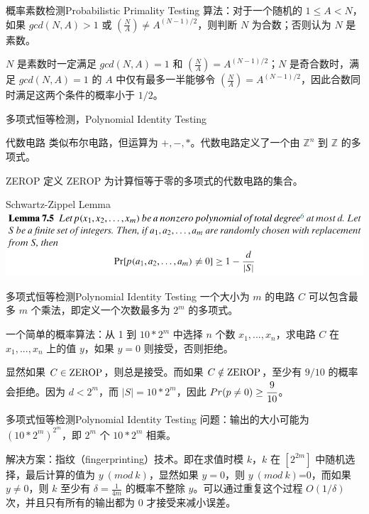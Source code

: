 \documentclass[UTF8,aspectratio=169,mathserif]{beamer}
\begin{document}
	\begin{frame}{概率素数检测}{Probabilistic Primality Testing}
		算法：对于一个随机的 $1\le A<N$，如果 $gcd(N,A)>1$ 或 $(\frac{N}{A})\neq A^{(N-1)/2}$，则判断 $N$ 为合数；否则认为 $N$ 是素数。\newline
		
		$N$ 是素数时一定满足 $gcd(N,A)=1$ 和 $(\frac{N}{A})=A^{(N-1)/2}$；$N$ 是奇合数时，满足 $gcd(N,A)=1$ 的 $A$ 中仅有最多一半能够令 $(\frac{N}{A})=A^{(N-1)/2}$，因此合数同时满足这两个条件的概率小于 $1/2$。
	\end{frame}
	
	\begin{frame}{多项式恒等检测，Polynomial Identity Testing}
		\begin{block}{代数电路}
			类似布尔电路，但运算为 $+,-,*$。代数电路定义了一个由 $\mathbb{Z}^n$ 到 $\mathbb{Z}$ 的多项式。
		\end{block}
		
		\begin{block}{ZEROP}
			定义 ZEROP 为计算恒等于零的多项式的代数电路的集合。
		\end{block}
	
		\begin{block}{Schwartz-Zippel Lemma}
			\includegraphics[width=\linewidth]{../../7/note.assets/image-20210509094630024.png}
		\end{block}
	\end{frame}

	\begin{frame}{多项式恒等检测}{Polynomial Identity Testing}
		一个大小为 $m$ 的电路 $C$ 可以包含最多 $m$ 个乘法，即定义一个次数最多为 $2^m$ 的多项式。\newline
		
		一个简单的概率算法：从 1 到 $10*2^m$ 中选择 $n$ 个数 $x_1,...,x_n$，求电路 $C$ 在 $x_1,...,x_n$ 上的值 $y$，如果 $y=0$ 则接受，否则拒绝。\newline
		
		显然如果 $C\in{\rm ZEROP}$，则总是接受。而如果 $C\notin{\rm ZEROP}$，至少有 $9/10$ 的概率会拒绝。因为 $d<2^m$，而 $|S|=10*2^m$，因此 $Pr(p\neq0)\ge\cfrac{9}{10}$。
	\end{frame}

	\begin{frame}{多项式恒等检测}{Polynomial Identity Testing}
		问题：输出的大小可能为 $(10*2^m)^{2^m}$，即 $2^m$ 个 $10*2^m$ 相乘。\newline
		
		解决方案：指纹（fingerprinting）技术。即在求值时模 $k$，$k$ 在 $[2^{2m}]$ 中随机选择，最后计算的值为 $y\ (mod\ k)$，显然如果 $y=0$，则 $y\ (mod\ k)$=0，而如果 $y\neq0$，则 $k$ 至少有 $\delta=\frac{1}{4m}$ 的概率不整除 $y$。可以通过重复这个过程 $O(1/\delta)$ 次，并且只有所有的输出都为 0 才接受来减小误差。
	\end{frame}
\end{document}
